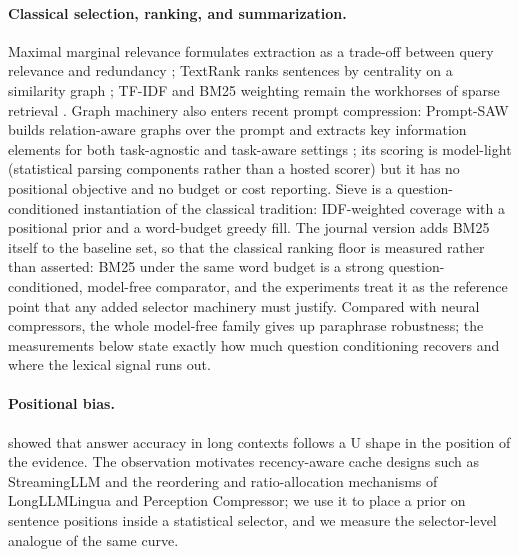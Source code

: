 \documentclass[preprint,12pt]{elsarticle}
\theoremstyle{remark}
\newcommand{\method}{Sieve}
\begin{document}
\paragraph{Classical selection, ranking, and summarization.}
Maximal marginal relevance formulates extraction as a trade-off
between query relevance and redundancy \citep{carbonell1998mmr};
TextRank ranks sentences by centrality on a similarity graph
\citep{mihalcea2004textrank}; TF-IDF and BM25 weighting remain the
workhorses of sparse retrieval \citep{robertson2009bm25}. Graph
machinery also enters recent prompt compression: Prompt-SAW builds
relation-aware graphs over the prompt and extracts key information
elements for both task-agnostic and task-aware settings
\citep{ali2024promptsaw}; its scoring is model-light (statistical
parsing components rather than a hosted scorer) but it has no
positional objective and no budget or cost reporting. \method{} is a
question-conditioned instantiation of the classical tradition:
IDF-weighted coverage with a positional prior and a word-budget greedy
fill. The journal version adds BM25 itself to the baseline set, so that
the classical ranking floor is measured rather than asserted: BM25 under
the same word budget is a strong question-conditioned,
model-free comparator, and the experiments treat it as the reference
point that any added selector machinery must justify. Compared with
neural compressors, the whole model-free family gives up paraphrase
robustness; the measurements below state exactly how much question
conditioning recovers and where the lexical signal runs out.

\paragraph{Positional bias.}
\citet{liu2023lost} showed that answer accuracy in long contexts
follows a U shape in the position of the evidence. The observation
motivates recency-aware cache designs such as StreamingLLM
\citep{xiao2023streaming} and the reordering and ratio-allocation
mechanisms of LongLLMLingua and Perception Compressor; we use it to
place a prior on sentence positions inside a statistical selector, and
we measure the selector-level analogue of the same curve.
\end{document}
